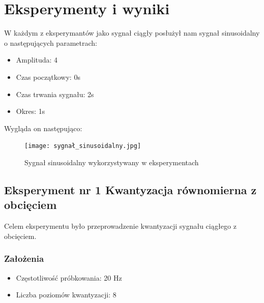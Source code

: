 \documentclass[12pt]{article}
\begin{document}
\section{Eksperymenty i wyniki}

W każdym z eksperymantów jako sygnał ciągły posłużył nam sygnał sinusoidalny o następujących parametrach: 
\begin{itemize}
	\item Amplituda: 4
	\item Czas początkowy: 0s
	\item Czas trwania sygnału: 2s
	\item Okres: 1s
\end{itemize}
Wygląda on następująco:
\begin{figure}[H]
    \centering
	\texttt{[image: sygnał\_sinusoidalny.jpg]}
    \caption{Sygnał sinusoidalny wykorzystywany w eksperymentach}
    \label{wykres dla eksperymentu 1}
\end{figure}


\subsection{Eksperyment nr 1 Kwantyzacja równomierna z obcięciem}

Celem eksperymentu było przeprowadzenie kwantyzacji sygnału ciągłego z obcięciem.

\subsubsection{Założenia}

\begin{itemize}
    \item Częstotliwość próbkowania: 20 Hz
    \item Liczba poziomów kwantyzacji: 8
\end{itemize}
\end{document}
